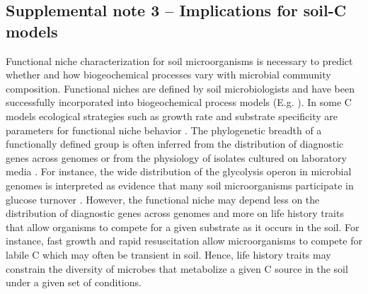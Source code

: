 \documentclass{article}
\begin{document}
\subsection{Supplemental note 3 -- Implications for soil-C models}
Functional niche characterization for soil microorganisms is necessary to
predict whether and how biogeochemical processes vary with microbial community
composition. Functional niches are defined by soil microbiologists and have
been successfully incorporated into biogeochemical process models (E.g.
\citep{wieder_2014a,Kaiser2014a}). In some C models ecological strategies such
as growth rate and substrate specificity are parameters for functional niche
behavior \citep{Kaiser2014a}. The phylogenetic breadth of a functionally
defined group is often inferred from the distribution of diagnostic genes
across genomes \citep{Berlemont2013} or from the physiology of isolates
cultured on laboratory media \citep{Martiny2013}. For instance, the wide
distribution of the glycolysis operon in microbial genomes is interpreted
as evidence that many soil microorganisms participate in glucose turnover
\citep{McGuire2010}. However, the functional niche may depend less on the
distribution of diagnostic genes across genomes and more on life history
traits that allow organisms to compete for a given substrate as it occurs
in the soil. For instance, fast growth and rapid resuscitation allow
microorganisms to compete for labile C which may often be transient in
soil. Hence, life history traits may constrain the diversity of microbes
that metabolize a given C source in the soil under a given set of
conditions.
\end{document}
